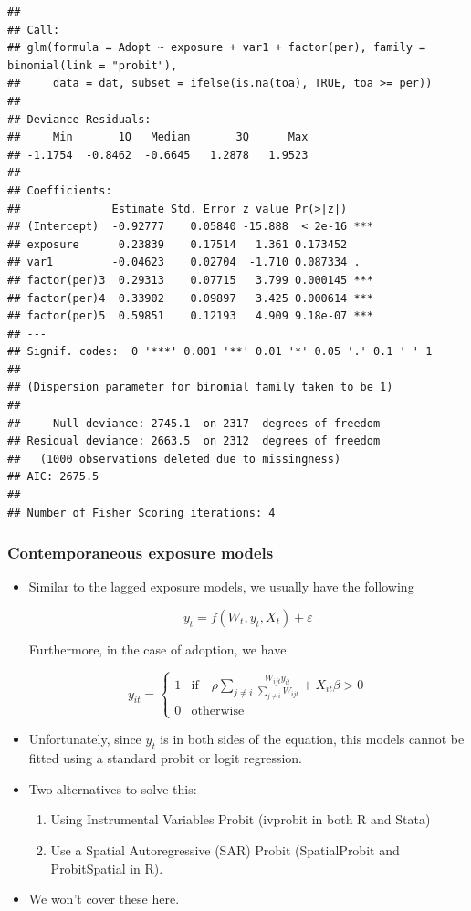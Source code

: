 \documentclass[
]{book}
\begin{document}
\begin{itemize}
\begin{verbatim}
## 
## Call:
## glm(formula = Adopt ~ exposure + var1 + factor(per), family = binomial(link = "probit"), 
##     data = dat, subset = ifelse(is.na(toa), TRUE, toa >= per))
## 
## Deviance Residuals: 
##     Min       1Q   Median       3Q      Max  
## -1.1754  -0.8462  -0.6645   1.2878   1.9523  
## 
## Coefficients:
##              Estimate Std. Error z value Pr(>|z|)    
## (Intercept)  -0.92777    0.05840 -15.888  < 2e-16 ***
## exposure      0.23839    0.17514   1.361 0.173452    
## var1         -0.04623    0.02704  -1.710 0.087334 .  
## factor(per)3  0.29313    0.07715   3.799 0.000145 ***
## factor(per)4  0.33902    0.09897   3.425 0.000614 ***
## factor(per)5  0.59851    0.12193   4.909 9.18e-07 ***
## ---
## Signif. codes:  0 '***' 0.001 '**' 0.01 '*' 0.05 '.' 0.1 ' ' 1
## 
## (Dispersion parameter for binomial family taken to be 1)
## 
##     Null deviance: 2745.1  on 2317  degrees of freedom
## Residual deviance: 2663.5  on 2312  degrees of freedom
##   (1000 observations deleted due to missingness)
## AIC: 2675.5
## 
## Number of Fisher Scoring iterations: 4
\end{verbatim}
\end{itemize}

\hypertarget{contemporaneous-exposure-models}{%
\subsubsection{Contemporaneous exposure models}\label{contemporaneous-exposure-models}}

\begin{itemize}
\item
  Similar to the lagged exposure models, we usually have the following

  \[
  y_t = f(W_t, y_t, X_t) + \varepsilon
  \]

  Furthermore, in the case of adoption, we have

  \[
  y_{it} = \left\{
  \begin{array}{ll}
  1 & \mbox{if}\quad \rho\sum_{j\neq i}\frac{W_{ijt}y_{it}}{\sum_{j\neq i}W_{ijt}} + X_{it}\beta > 0\\
  0 & \mbox{otherwise}
  \end{array}
  \right.
  \]
\item
  Unfortunately, since \(y_t\) is in both sides of the equation, this models cannot
  be fitted using a standard probit or logit regression.
\item
  Two alternatives to solve this:

  \begin{enumerate}
  \def\labelenumi{\alph{enumi}.}
  \item
    Using Instrumental Variables Probit (ivprobit in both R and Stata)
  \item
    Use a Spatial Autoregressive (SAR) Probit (SpatialProbit and ProbitSpatial in R).
  \end{enumerate}
\item
  We won't cover these here.
\end{itemize}
\end{document}
